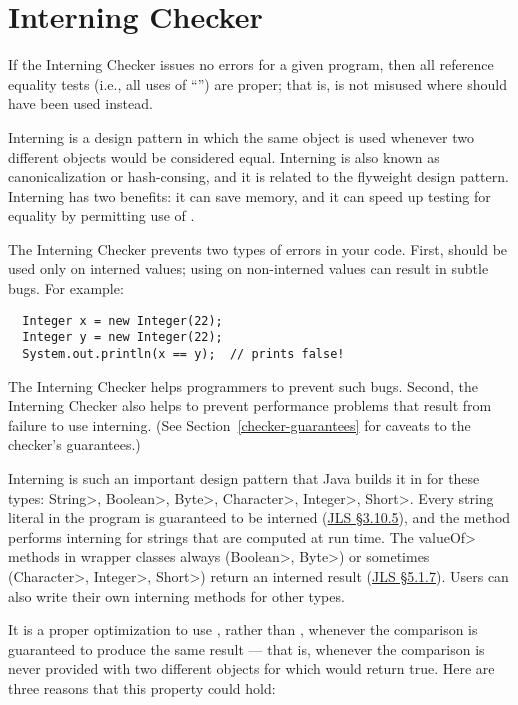 \htmlhr
\chapter{Interning Checker\label{interning-checker}}

If the Interning Checker issues no errors for a given program, then all
reference equality tests (i.e., all uses of ``\code{==}'') are proper;
that is,
\code{==} is not misused where  should have been used instead.

Interning is a design pattern in which the same object is used whenever two
different objects would be considered equal.  Interning is also known as
canonicalization or hash-consing, and it is related to the flyweight design
pattern.
Interning has two benefits:  it can save memory, and it can speed up testing for
equality by permitting use of \code{==}.

The Interning Checker prevents two types of errors in your code.  First, 
\code{==} should be used
only on interned values; using \code{==} on
non-interned values can result in subtle bugs.  For example:

\begin{Verbatim}
  Integer x = new Integer(22);
  Integer y = new Integer(22);
  System.out.println(x == y);  // prints false!
\end{Verbatim}

\noindent
The Interning Checker helps programmers to prevent such bugs.
Second, 
the Interning Checker also helps to prevent performance problems that result
from failure to use interning.
(See Section~\ref{checker-guarantees} for caveats to the checker's guarantees.)

Interning is such an important design pattern that Java builds it in for
these types: \<String>, \<Boolean>, \<Byte>, \<Character>, \<Integer>,
\<Short>.  Every string literal in the program is guaranteed to be interned
(\href{https://docs.oracle.com/javase/specs/jls/se8/html/jls-3.html#jls-3.10.5}{JLS
  \S3.10.5}), and the
 method
performs interning for strings that are computed at run time.
The \<valueOf> methods in wrapper classes always (\<Boolean>, \<Byte>) or
sometimes (\<Character>, \<Integer>, \<Short>) return an interned result
(\href{https://docs.oracle.com/javase/specs/jls/se8/html/jls-5.html#jls-5.1.7}{JLS \S5.1.7}).
Users can also write their own interning methods for other types.

It is a proper optimization to use \code{==}, rather than ,
whenever the comparison is guaranteed to produce the same result --- that
is, whenever the comparison is never provided with two different objects
for which  would return true.  Here are three reasons that
this property could hold:

